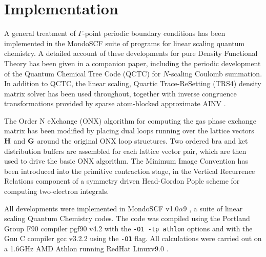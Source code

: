 \documentclass[prb,aps,nobibnotes,twocolumn,doublespace,twocolumngrid,superbib,showpacs]{revtex4}
\begin{document}

\section{Implementation}\label{implementation}

A general treatment of $\Gamma$-point periodic boundary conditions has been implemented in the {\sc MondoSCF}\cite{MondoSCF}
suite of programs for linear scaling quantum chemistry.  A detailed account of these developments for 
pure Density Functional Theory has been given in a companion paper\cite{CTymczak04A}, including the periodic 
development of the Quantum Chemical Tree Code ({\sc QCTC}) for $N$-scaling Coulomb summation.  In addition to QCTC, 
the linear scaling, Quartic Trace-ReSetting ({\sc TRS4}) \cite{ANiklasson03} density matrix solver has been used throughout, 
together with inverse congruence transformations provided by sparse atom-blocked approximate {\sc AINV} \cite{MBenzi01}.  

The Order N eXchange ({\sc ONX}) algorithm \cite{ESchwegler97} for computing the gas phase exchange matrix 
has been modified by placing dual loops running over the lattice vectors 
${\bf H}$ and ${\bf G}$ around the original ONX loop structures.  Two ordered bra and ket distribution 
buffers are assembled for each lattice vector pair, which are then used to drive the basic {\sc ONX} algorithm.
The Minimum Image Convention has been introduced into the primitive contraction stage, in the 
Vertical Recurrence Relations component of a symmetry driven Head-Gordon Pople \cite{MHeadgordon88} scheme for 
computing two-electron integrals.  

All developments  were implemented in  {\sc MondoSCF} v1.0$\alpha$9 \cite{MondoSCF}, a suite of 
linear scaling Quantum Chemistry codes.  The code was compiled using the Portland 
Group F90 compiler {\sc pgf90} v4.2 \cite{pgf90} with the {\tt -O1 -tp athlon} options  and with the 
Gnu C compiler {\sc gcc} v3.2.2 using the {\tt -O1} flag.  All calculations were carried out on a 
1.6GHz AMD Athlon running RedHat  {\sc Linux}v9.0 \cite{RedHat90}.   
\end{document}

